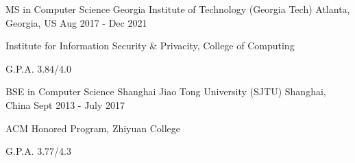 


\begin{cventries}


\cventry
{MS in Computer Science} %
{Georgia Institute of Technology (Georgia Tech)} %
{Atlanta, Georgia, US} %
{Aug 2017 - Dec 2021} %
{ %
\begin{cvitems}
\item {Institute for Information Security \& Privacity, College of Computing}
\item {G.P.A. 3.84/4.0}
\end{cvitems}
}

\cventry
{BSE in Computer Science} %
{Shanghai Jiao Tong University (SJTU)} %
{Shanghai, China} %
{Sept 2013 - July 2017} %
{ %
	\begin{cvitems}
		\item {ACM Honored Program, Zhiyuan College}
		\item {G.P.A. 3.77/4.3}
	\end{cvitems}
}


\end{cventries}